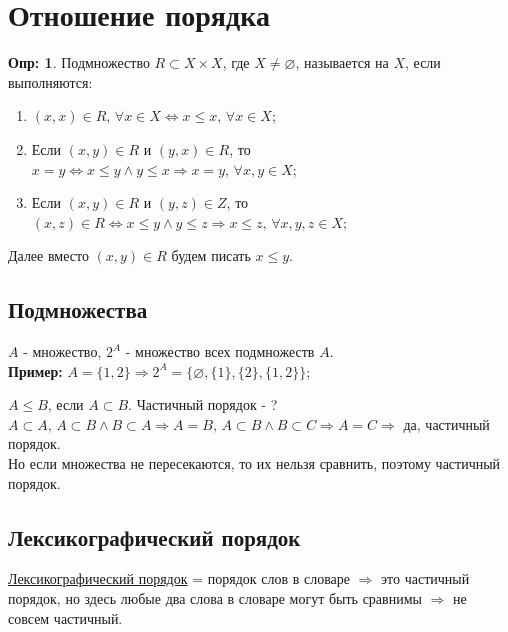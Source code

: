 \documentclass[12pt]{article}
\theoremstyle{definition}
\newtheorem{defn}{Опр:}
\begin{document}
	
\section*{Отношение порядка}
	
\begin{defn}
	Подмножество $R \subset X\times X$, где $X \neq \varnothing$, называется  на $X$, если выполняются:
	\begin{enumerate}[label={(\arabic*)}]
		\item $(x,x) \in R,\, \forall x \in X \Leftrightarrow x \leq x, \, \forall x \in X$;
		\item Если $(x,y) \in R$ и $(y,x) \in R$, то $x=y \Leftrightarrow x \leq y \wedge y \leq x \Rightarrow x = y,\, \forall x,y \in X$;
		\item Если $(x,y) \in R$ и $(y,z) \in Z$, то $(x,z) \in R \Leftrightarrow x \leq y \wedge y \leq z \Rightarrow x \leq z, \, \forall x, y, z \in X$;
	\end{enumerate}
\end{defn}
	
Далее вместо $(x,y) \in R$ будем писать $x\leq y$.

\subsection*{Подмножества}

$A$ - множество, $2^A$ - множество всех подмножеств $A$.\\
\textbf{Пример:} $A = \{1,2\} \Rightarrow 2^A = \big\{ \varnothing, \{1\}, \{2\}, \{1,2\} \big\}$;

$A \leq B$, если $A\subset B$. Частичный порядок - ?\\
$A \subset A,\, A \subset B \wedge B \subset A \Rightarrow A = B,\, A \subset B \wedge B \subset C \Rightarrow A = C \Rightarrow$ да, частичный порядок.\\
Но если множества не пересекаются, то их нельзя сравнить, поэтому частичный порядок.

\subsection*{Лексикографический порядок}
\uline{Лексикографический порядок} = порядок слов в словаре $\Rightarrow$ это частичный порядок, но здесь любые два слова в словаре могут быть сравнимы $\Rightarrow$ не совсем частичный.
\end{document}
